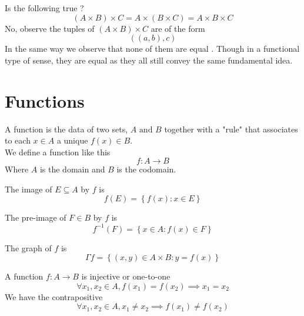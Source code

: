 \documentclass[11pt]{book}
\begin{document}
\begin{ex}
    Is the following true ?
    \[
        \left( A\times B \right) \times C = A\times \left( B\times C \right) = A\times B\times C
    \]
    No, observe the tuples of $\left( A\times B \right) \times C$ are of the form
    \[
        \left( \left( a,b \right) ,c \right) 
    \]
    In the same way we observe that none of them are equal . Though in a functional type of sense, they are equal as they all still convey the same fundamental idea.
\end{ex}

\section{Functions}%
\label{sec:functions}

\begin{defn}[Function]\label{defn:function}
    A function is the data of two sets, $A \text{ and } B$ together with a "rule" that associates to each $x\in A$ a unique $f\left(x\right) \in B$. \\
    We define a function like this
    \[
    f : A \to B 
    \]
    Where $A$  is the domain and $B$ is the codomain.
\end{defn}

\begin{defn}[Image]\label{defn:image}
    The image of $E \subseteq A$ by $f$ is
    \[
    f\left(E\right) = \left\{ f\left(x\right) : x\in E \right\} 
    \]
\end{defn}

\begin{defn}\label{defn:pre_image}
    The pre-image of $F\in B$ by $f$ is
    \[
    f^{-1} \left(F\right) = \left\{ x\in A: f\left(x\right) \in F \right\} 
    \]
\end{defn}

\begin{defn}[Graph]\label{defn:graph}
    The graph of $f$ is 
    \[
        \Gamma f = \left\{ \left( x,y \right) \in A\times B:y = f\left(x\right)  \right\} 
    \]
\end{defn}

\begin{defn}[Injective]\label{defn:injective}
    A function $f : A \to B $ is injective or one-to-one 
    \[
    \forall x_1,x_2 \in A, f\left(x_1\right) = f\left(x_2\right) \implies x_1= x_2
    \]
    We have the contrapositive 
    \[
    \forall x_1,x_2 \in A, x_1 \neq x_2 \implies f\left(x_1\right) \neq f\left(x_2\right) 
    \]
\end{defn}
\end{document}
